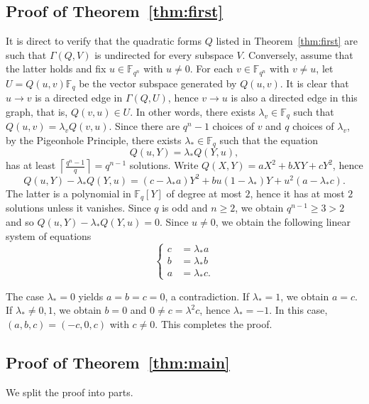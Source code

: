 \documentclass[11pt]{amsart}
\newcommand{\F}{\mathbb F}
\theoremstyle{definition}
\theoremstyle{remark}
\begin{document}
\subsection{Proof of Theorem~\ref{thm:first}}
It is direct to verify that the quadratic forms $Q$ listed in Theorem~\ref{thm:first} are such that $\Gamma(Q, V)$ is undirected for every subspace $V$. Conversely, assume that the latter holds and fix $u\in\F_{q^n}$ with $u\ne 0$. For each $v\in \F_{q^n}$ with $v\ne u$, let $U=Q(u, v)\F_q$ be the vector subspace generated by $Q(u, v)$. It is clear that $u\to v$ is a directed edge in $\Gamma(Q, U)$, hence $v\to u$ is also a directed edge in this graph, that is, $Q(v, u)\in U$. In other words, there exists $\lambda_v\in \F_{q}$ such that $Q(u, v)=\lambda_v Q(v, u)$. Since there are $q^{n}-1$ choices of $v$ and $q$ choices of $\lambda_v$, by the Pigeonhole Principle, there exists $\lambda_* \in \F_{q}$ such that the equation
$$Q(u, Y)=\lambda_* Q(Y, u),$$
has at least $\left\lceil\frac{q^n-1}{q}\right\rceil=q^{n-1}$ solutions. Write $Q(X, Y)=aX^2+bXY+cY^2$, hence 
$$Q(u, Y)-\lambda_* Q(Y, u)=(c-\lambda_* a)Y^2+bu(1-\lambda_*)Y+u^2(a-\lambda_* c).$$
The latter is a polynomial in $\F_q[Y]$ of degree at most $2$, hence it has at most $2$ solutions unless it vanishes.
Since $q$ is odd and $n\ge 2$, we obtain $q^{n-1}\ge 3>2$ and so $Q(u, Y)-\lambda_*Q(Y, u)=0$. Since $u\ne 0$, we obtain the following linear system of equations
$$\begin{cases}
    c&=\lambda_* a\\ b&=\lambda_*b\\  a&=\lambda_* c.
\end{cases}$$

The case $\lambda_*=0$ yields $a=b=c=0$, a contradiction. If $\lambda_*=1$, we obtain $a=c$. If $\lambda_*\ne 0, 1$, we obtain $b=0$ and $0\ne c=\lambda^2 c$, hence $\lambda_*=-1$. In this case, $(a, b, c)=(-c, 0, c)$ with $c\ne 0$. This completes the proof. 

\subsection{Proof of Theorem~\ref{thm:main}}
We split the proof into parts. 
\end{document}
